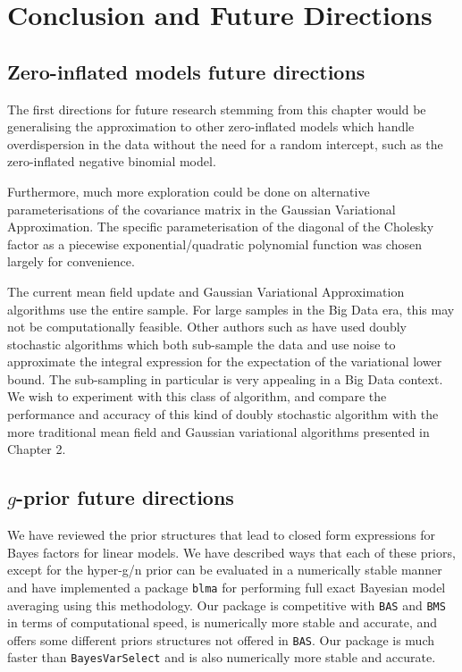 \chapter{Conclusion and Future Directions}

\section{Zero-inflated models future directions}
		
The first directions for future research stemming from this chapter would be generalising the approximation to
other zero-inflated models which handle overdispersion in the data without the need for a random intercept, such 
as the zero-inflated negative binomial model.

Furthermore, much more exploration could be done on alternative parameterisations of the covariance matrix in the 
Gaussian Variational Approximation. The specific parameterisation of the diagonal of the Cholesky factor as a
piecewise exponential/quadratic polynomial function was chosen largely for convenience.

The current mean field update and Gaussian Variational Approximation algorithms use the entire sample. For
large samples in the Big Data era, this may not be computationally feasible. Other authors such as
\cite{TanNott2018} have used doubly stochastic algorithms which both sub-sample the data and use noise to
approximate the integral expression for the expectation of the variational lower bound. The sub-sampling in
particular is very appealing in a Big Data context. We wish to experiment with this class of algorithm, and
compare the performance and accuracy of this kind of doubly stochastic algorithm with the more 
traditional mean field and Gaussian variational algorithms presented in Chapter 2.

\section{$g$-prior future directions}

We have reviewed the prior structures that lead to
closed form expressions for Bayes factors for linear models. We have described ways that each of these priors,
except for the hyper-g/n prior can be evaluated in a numerically stable manner and have implemented a package
\texttt{blma} for performing full exact Bayesian model averaging using this methodology. Our package is
competitive with \texttt{BAS} and \texttt{BMS} in terms of computational speed, is numerically more stable and
accurate, and offers some different priors structures not offered in \texttt{BAS}. Our package is much faster
than \texttt{BayesVarSelect} and is also numerically more stable and accurate.

